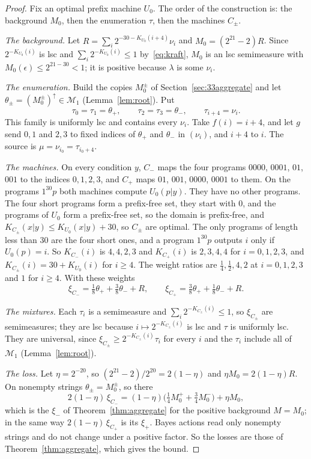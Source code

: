 \documentclass[11pt]{article}
\newcommand{\eps}{\epsilon}
\newcommand{\cMone}{\mathcal{M}_1}
\theoremstyle{definition}
\theoremstyle{remark}
\begin{document}
\begin{proof}
Fix an optimal prefix machine $U_0$. The order of the construction is: the
background $M_0$, then the enumeration $\tau$, then the machines $C_\pm$.

\emph{The background.} Let
$R=\sum_i2^{-30-K_{U_0}(i+4)}\nu_i$ and $M_0=(2^{21}-2)R$. Since
$2^{-K_{U_0}(i)}$ is lsc and $\sum_i2^{-K_{U_0}(i)}\le1$
by~\eqref{eq:kraft}, $M_0$ is an lsc semimeasure with
$M_0(\eps)\le2^{21-30}<1$; it is positive because $\lambda$ is some $\nu_i$.

\emph{The enumeration.} Build the copies $M_0^\pm$ of
Section~\ref{sec:33aggregate} and let $\theta_\pm=(M_0^\pm)^\uparrow\in\cMone$
(Lemma~\ref{lem:root}). Put
\[
\tau_0=\tau_1=\theta_+,\qquad \tau_2=\tau_3=\theta_-,\qquad \tau_{i+4}=\nu_i .
\]
This family is uniformly lsc and contains every $\nu_i$. Take $f(i)=i+4$, and
let $g$ send $0,1$ and $2,3$ to fixed indices of $\theta_+$ and $\theta_-$ in
$(\nu_i)$, and $i+4$ to $i$. The source is $\mu=\nu_{i_0}=\tau_{i_0+4}$.

\emph{The machines.} On every condition $y$, $C_-$ maps the four programs
$0000$, $0001$, $01$, $001$ to the indices $0,1,2,3$, and $C_+$ maps
$01$, $001$, $0000$, $0001$ to them. On the programs $1^{30}p$ both machines
compute $U_0(p|y)$. They have no other programs. The four short programs form a prefix-free set, they start with $0$, and the
programs of $U_0$ form a prefix-free set, so the domain is prefix-free, and
$K_{C_\pm}(x|y)\le K_{U_0}(x|y)+30$, so $C_\pm$ are optimal. The only
programs of length less than $30$ are the four short ones, and a program
$1^{30}p$ outputs $i$ only if $U_0(p)=i$. So $K_{C_-}(i)$ is $4,4,2,3$ and
$K_{C_+}(i)$ is $2,3,4,4$ for $i=0,1,2,3$, and
$K_{C_\pm}(i)=30+K_{U_0}(i)$ for $i\ge4$. The weight ratios are
$\frac14,\frac12,4,2$ at $i=0,1,2,3$ and $1$ for $i\ge4$. With these weights
\[
\xi_{C_-}=\tfrac18\theta_++\tfrac38\theta_-+R,\qquad
\xi_{C_+}=\tfrac38\theta_++\tfrac18\theta_-+R .
\]

\emph{The mixtures.} Each $\tau_i$ is a semimeasure and
$\sum_i2^{-K_{C_\pm}(i)}\le1$, so $\xi_{C_\pm}$ are semimeasures; they are
lsc because $i\mapsto2^{-K_{C_\pm}(i)}$ is lsc and $\tau$ is uniformly lsc.
They are universal, since $\xi_{C_\pm}\ge2^{-K_{C_\pm}(i)}\tau_i$ for every
$i$ and the $\tau_i$ include all of $\cMone$ (Lemma~\ref{lem:root}).

\emph{The loss.} Let $\eta=2^{-20}$, so $(2^{21}-2)/2^{20}=2(1-\eta)$ and
$\eta M_0=2(1-\eta)R$. On nonempty strings $\theta_\pm=M_0^\pm$, so there
\[
2(1-\eta)\,\xi_{C_-}=(1-\eta)\bigl(\tfrac14M_0^++\tfrac34M_0^-\bigr)+\eta M_0,
\]
which is the $\xi_-$ of Theorem~\ref{thm:aggregate} for the positive
background $M=M_0$; in the same way $2(1-\eta)\,\xi_{C_+}$ is its $\xi_+$.
Bayes actions read only nonempty strings and do not change under a positive
factor. So the losses are those of Theorem~\ref{thm:aggregate}, which gives
the bound.
\end{proof}
\end{document}
